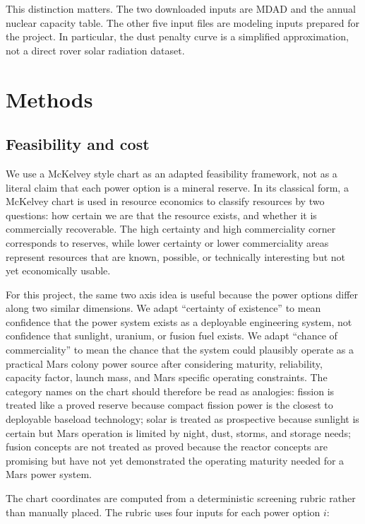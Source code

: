 \documentclass[11pt]{article}
\begin{document}
This distinction matters. The two downloaded inputs are MDAD and the annual nuclear capacity table. The other five input files are modeling inputs prepared for the project. In particular, the dust penalty curve is a simplified approximation, not a direct rover solar radiation dataset.

\section{Methods}

\subsection{Feasibility and cost}

We use a McKelvey style chart as an adapted feasibility framework, not as a literal claim that each power option is a mineral reserve. In its classical form, a McKelvey chart is used in resource economics to classify resources by two questions: how certain we are that the resource exists, and whether it is commercially recoverable. The high certainty and high commerciality corner corresponds to reserves, while lower certainty or lower commerciality areas represent resources that are known, possible, or technically interesting but not yet economically usable.

For this project, the same two axis idea is useful because the power options differ along two similar dimensions. We adapt ``certainty of existence'' to mean confidence that the power system exists as a deployable engineering system, not confidence that sunlight, uranium, or fusion fuel exists. We adapt ``chance of commerciality'' to mean the chance that the system could plausibly operate as a practical Mars colony power source after considering maturity, reliability, capacity factor, launch mass, and Mars specific operating constraints. The category names on the chart should therefore be read as analogies: fission is treated like a proved reserve because compact fission power is the closest to deployable baseload technology; solar is treated as prospective because sunlight is certain but Mars operation is limited by night, dust, storms, and storage needs; fusion concepts are not treated as proved because the reactor concepts are promising but have not yet demonstrated the operating maturity needed for a Mars power system.

The chart coordinates are computed from a deterministic screening rubric rather than manually placed. The rubric uses four inputs for each power option \(i\):
\end{document}

